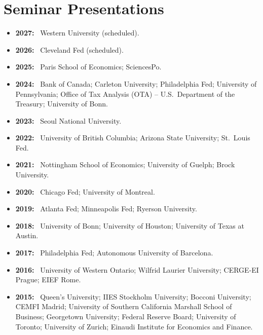 \documentclass[letterpaper]{article}
\newcommand{\yr}[1]{\textbf{#1:}\ }
\begin{document}
\section*{Seminar Presentations}
\begin{itemize}
\item \yr{2027} Western University (scheduled).
\item \yr{2026} Cleveland Fed (scheduled).
\item \yr{2025} Paris School of Economics; SciencesPo.
\item \yr{2024} Bank of Canada; Carleton University; Philadelphia Fed; University of Pennsylvania; Office of Tax Analysis (OTA) -- U.S.\ Department of the Treasury; University of Bonn.
\item \yr{2023} Seoul National University.
\item \yr{2022} University of British Columbia; Arizona State University; St.\ Louis Fed.
\item \yr{2021} Nottingham School of Economics; University of Guelph; Brock University.
\item \yr{2020} Chicago Fed; University of Montreal.
\item \yr{2019} Atlanta Fed; Minneapolis Fed; Ryerson University.
\item \yr{2018} University of Bonn; University of Houston; University of Texas at Austin.
\item \yr{2017} Philadelphia Fed; Autonomous University of Barcelona.
\item \yr{2016} University of Western Ontario; Wilfrid Laurier University; CERGE-EI Prague; EIEF Rome.
\item \yr{2015} Queen's University; IIES Stockholm University; Bocconi University; CEMFI Madrid; University of Southern California Marshall School of Business; Georgetown University; Federal Reserve Board; University of Toronto; University of Zurich; Einaudi Institute for Economics and Finance.
\end{itemize}

\end{document}
